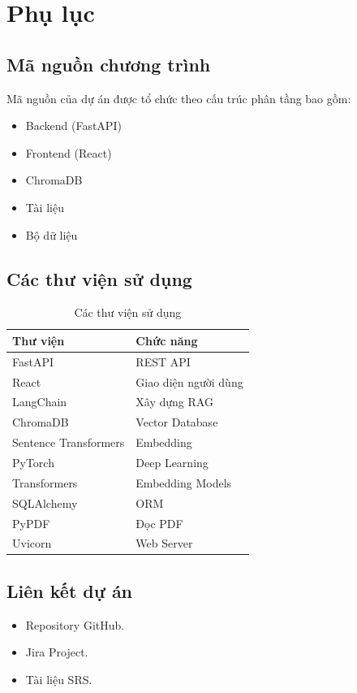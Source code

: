 \chapter{Phụ lục}
\section{Mã nguồn chương trình}

Mã nguồn của dự án được tổ chức theo cấu trúc phân tầng bao gồm:

\begin{itemize}
	\item Backend (FastAPI)
	\item Frontend (React)
	\item ChromaDB
	\item Tài liệu
	\item Bộ dữ liệu
\end{itemize}
\section{Các thư viện sử dụng}

\begin{table}[H]
	\centering
	\begin{tabular}{|l|l|}
		\hline
		Thư viện & Chức năng\\
		\hline
		FastAPI & REST API\\
		React & Giao diện người dùng\\
		LangChain & Xây dựng RAG\\
		ChromaDB & Vector Database\\
		Sentence Transformers & Embedding\\
		PyTorch & Deep Learning\\
		Transformers & Embedding Models\\
		SQLAlchemy & ORM\\
		PyPDF & Đọc PDF\\
		Uvicorn & Web Server\\
		\hline
	\end{tabular}
	\caption{Các thư viện sử dụng}
\end{table}

\section{Liên kết dự án}

\begin{itemize}
	\item Repository GitHub.
	\item Jira Project.
	\item Tài liệu SRS.
\end{itemize}

